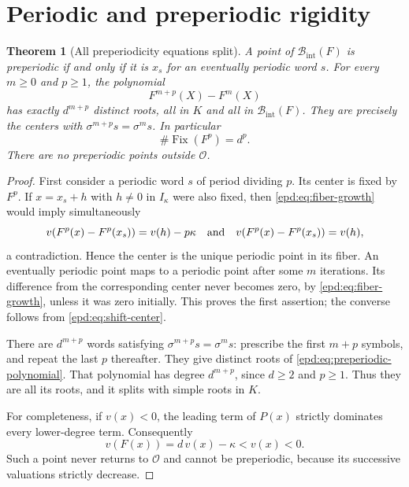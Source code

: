 \documentclass[11pt,a4paper]{article}
\numberwithin{equation}{section}
\newtheorem{theorem}{Theorem}[section]
\theoremstyle{plain}
\theoremstyle{definition}
\theoremstyle{remark}
\newcommand{\OO}{\mathcal O}
\newcommand{\Ik}{I_\kappa}
\newcommand{\BI}{\mathcal B_{\mathrm{int}}}
\newcommand{\sh}{\sigma}
\newcommand{\Fix}{\operatorname{Fix}}
\begin{document}
\section{Periodic and preperiodic rigidity}
\label{epd:sec:periodic}
\begin{theorem}[All preperiodicity equations split]\label{epd:thm:periodic}
A point of $\BI(F)$ is preperiodic if and only if it is $x_s$ for an
eventually periodic word $s$. For every $m\geq0$ and $p\geq1$, the
polynomial
\begin{equation}\label{epd:eq:preperiodic-polynomial}
 F^{m+p}(X)-F^m(X)
\end{equation}
has exactly $d^{m+p}$ distinct roots, all in $K$ and all in $\BI(F)$.
They are precisely the centers with $\sh^{m+p}s=\sh^m s$. In particular
\[
 \#\Fix(F^p)=d^p.
\]
There are no preperiodic points outside $\OO$.
\end{theorem}
\begin{proof}
First consider a periodic word $s$ of period dividing $p$. Its center
is fixed by $F^p$. If $x=x_s+h$ with $h\ne0$ in $\Ik$ were also fixed,
then \eqref{epd:eq:fiber-growth} would imply simultaneously
\[
 v(F^p(x)-F^p(x_s))=v(h)-p\kappa
 \quad\hbox{and}\quad
 v(F^p(x)-F^p(x_s))=v(h),
\]
a contradiction. Hence the center is the unique periodic point in its
fiber. An eventually periodic point maps to a periodic point after
some $m$ iterations. Its difference from the corresponding center
never becomes zero, by \eqref{epd:eq:fiber-growth}, unless it was zero
initially. This proves the first assertion; the converse follows from
\eqref{epd:eq:shift-center}.

There are $d^{m+p}$ words satisfying $\sh^{m+p}s=\sh^m s$: prescribe
the first $m+p$ symbols, and repeat the last $p$ thereafter. They give
distinct roots of \eqref{epd:eq:preperiodic-polynomial}. That polynomial
has degree $d^{m+p}$, since $d\geq2$ and $p\geq1$. Thus they are all
its roots, and it splits with simple roots in $K$.

For completeness, if $v(x)<0$, the leading term of $P(x)$ strictly
dominates every lower-degree term. Consequently
\begin{equation}\label{epd:eq:escape-step}
 v(F(x))=d\,v(x)-\kappa<v(x)<0.
\end{equation}
Such a point never returns to $\OO$ and cannot be preperiodic, because
its successive valuations strictly decrease.
\end{proof}
\end{document}
